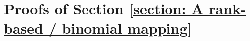 \documentclass{article}
\begin{document}

\section{Proofs of Section \ref{section: A rank-based / binomial mapping}}\label{appendix:proofs section A rank-based / binomial mapping}
\end{document}
